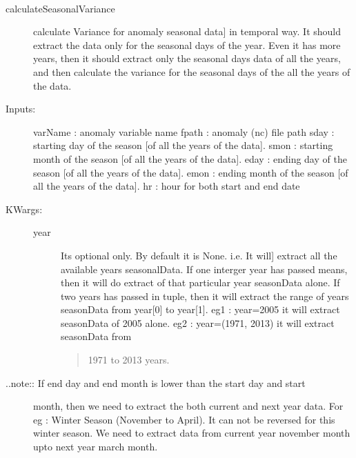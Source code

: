 \documentclass[letterpaper,10pt,english]{sphinxmanual}
\begin{document}

\begin{fulllineitems}
\label{mjo:variance_utils.calculateSeasonalVariance}~\begin{description}
\item[{calculateSeasonalVariance}] \leavevmode{[}calculate Variance for anomaly seasonal data{]}
in temporal way. It should extract the data only for the seasonal
days of the year. Even it has more years, then it should extract
only the seasonal days data of all the years, and then calculate
the variance for the seasonal days of the all the years of the data.

\item[{Inputs:}] \leavevmode
varName : anomaly variable name
fpath : anomaly (nc) file path
sday : starting day of the season {[}of all the years of the data{]}.
smon : starting month of the season {[}of all the years of the data{]}.
eday : ending day of the season {[}of all the years of the data{]}.
emon : ending month of the season {[}of all the years of the data{]}.
hr : hour for both start and end date

\item[{KWargs:}] \leavevmode\begin{description}
\item[{year}] \leavevmode{[}Its optional only. By default it is None. i.e. It will{]}
extract all the available years seasonalData.
If one interger year has passed means, then it will do
extract of that particular year seasonData alone.
If two years has passed in tuple, then it will extract
the range of years seasonData from year{[}0{]} to year{[}1{]}.
eg1 : year=2005 it will extract seasonData of 2005 alone.
eg2 : year=(1971, 2013) it will extract seasonData from
\begin{quote}

1971 to 2013 years.
\end{quote}

\end{description}

\item[{..note::    If end day and end month is lower than the start day and start}] \leavevmode
month, then we need to extract the both current and next year
data. For eg : Winter Season (November to April).
It can not be reversed for this winter season. We need to
extract data from current year november month upto next year
march month.
\begin{quote}


\end{quote}
\end{description}
\end{fulllineitems}
\end{document}
